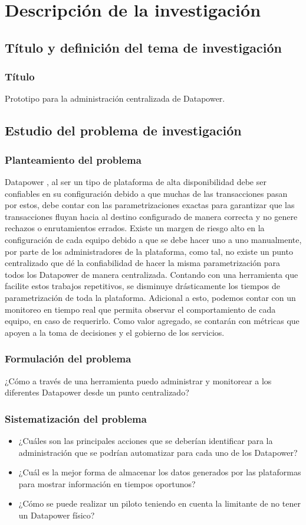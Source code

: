
\chapter{Descripción de la investigación}
\newpage
\section{Título y definición del tema de investigación}
\subsection*{Título}
Prototipo para la administración centralizada de Datapower.
\section{Estudio del problema de investigación}
\subsection{Planteamiento del problema}
Datapower , al ser un tipo de plataforma de alta disponibilidad debe ser confiables en su configuración debido a que muchas de las transacciones pasan por estos,  debe contar con las parametrizaciones exactas para garantizar que las transacciones fluyan hacia al destino configurado de manera correcta y no genere rechazos o enrutamientos errados. Existe un margen de riesgo alto en la configuración de cada equipo debido a que se debe hacer uno a uno manualmente, por parte de los administradores de la plataforma, como tal, no existe un punto centralizado que dé la confiabilidad de hacer la misma parametrización para todos los Datapower  de manera centralizada. 
\newline
Contando con una herramienta que facilite estos trabajos repetitivos, se disminuye drásticamente los tiempos de parametrización de toda la plataforma. Adicional a esto, podemos contar con un monitoreo en tiempo real que permita observar el comportamiento de cada equipo, en caso de requerirlo. Como valor agregado, se contarán con métricas que apoyen a la toma de decisiones y el gobierno de los servicios.
\subsection{Formulación del problema}
¿Cómo a través de una herramienta puedo administrar y monitorear a los diferentes Datapower  desde un punto centralizado?
\subsection{Sistematización del problema}
\begin{itemize}
    \item ¿Cuáles son las principales acciones que se deberían identificar para la administración que se podrían automatizar para cada uno de los Datapower?
    \item ¿Cuál es la mejor forma de almacenar los datos generados por las plataformas para mostrar información en tiempos oportunos?
    \item ¿Cómo se puede realizar un piloto teniendo en cuenta la limitante de no tener un Datapower  físico?
\end{itemize}
\newpage

